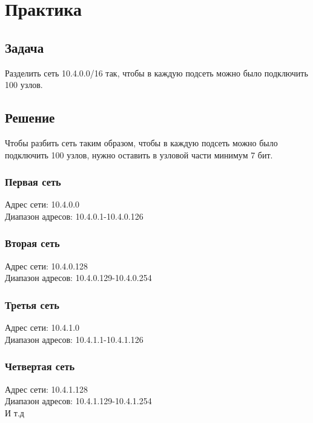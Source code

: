\chapter{Практика}

\section{Задача}
Разделить сеть 10.4.0.0/16 так, чтобы в каждую подсеть можно было подключить 100 узлов.

\section{Решение}

Чтобы разбить сеть таким образом, чтобы в каждую подсеть можно было подключить 100 узлов, нужно оставить в узловой части минимум
7 бит.

\subsection{Первая сеть}
Адрес сети: 10.4.0.0 \\
Диапазон адресов: 10.4.0.1-10.4.0.126

\subsection{Вторая сеть}
Адрес сети: 10.4.0.128 \\
Диапазон адресов: 10.4.0.129-10.4.0.254

\subsection{Третья сеть}
Адрес сети: 10.4.1.0 \\
Диапазон адресов: 10.4.1.1-10.4.1.126

\subsection{Четвертая сеть}
Адрес сети: 10.4.1.128 \\
Диапазон адресов: 10.4.1.129-10.4.1.254 \\

И т.д


\endinput